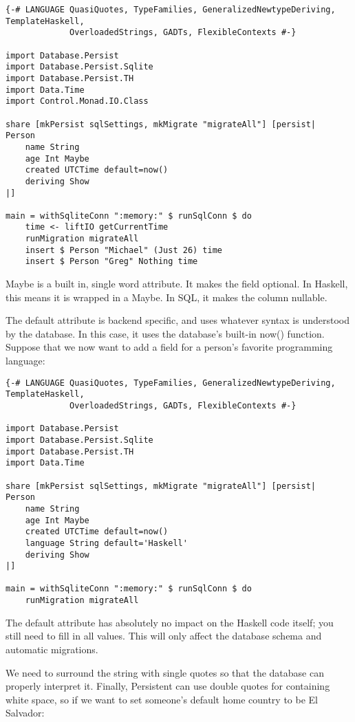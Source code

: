 \begin{lstlisting}
{-# LANGUAGE QuasiQuotes, TypeFamilies, GeneralizedNewtypeDeriving, TemplateHaskell,
             OverloadedStrings, GADTs, FlexibleContexts #-}

import Database.Persist
import Database.Persist.Sqlite
import Database.Persist.TH
import Data.Time
import Control.Monad.IO.Class

share [mkPersist sqlSettings, mkMigrate "migrateAll"] [persist|
Person
    name String
    age Int Maybe
    created UTCTime default=now()
    deriving Show
|]

main = withSqliteConn ":memory:" $ runSqlConn $ do
    time <- liftIO getCurrentTime
    runMigration migrateAll
    insert $ Person "Michael" (Just 26) time
    insert $ Person "Greg" Nothing time
\end{lstlisting}%

Maybe is a built in, single word attribute. It makes the field optional. In Haskell, this means it is wrapped in a Maybe. In SQL, it makes the column nullable.

The default attribute is backend specific, and uses whatever syntax is understood by the database. In this case, it uses the database's built-in now() function. Suppose that we now want to add a field for a person's favorite programming language:

\begin{lstlisting}
{-# LANGUAGE QuasiQuotes, TypeFamilies, GeneralizedNewtypeDeriving, TemplateHaskell,
             OverloadedStrings, GADTs, FlexibleContexts #-}

import Database.Persist
import Database.Persist.Sqlite
import Database.Persist.TH
import Data.Time

share [mkPersist sqlSettings, mkMigrate "migrateAll"] [persist|
Person
    name String
    age Int Maybe
    created UTCTime default=now()
    language String default='Haskell'
    deriving Show
|]

main = withSqliteConn ":memory:" $ runSqlConn $ do
    runMigration migrateAll
\end{lstlisting}%

The default attribute has absolutely no impact on the Haskell code itself; you still need to fill in all values. This will only affect the database schema and automatic migrations.

We need to surround the string with single quotes so that the database can properly interpret it. Finally, Persistent can use double quotes for containing white space, so if we want to set someone's default home country to be El Salvador:

